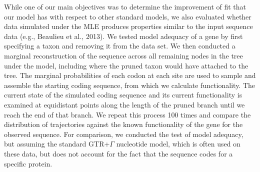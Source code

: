 \documentclass{article}
\begin{document}
While one of our main objectives was to determine the improvement of fit that our model has with respect to other standard models, we also evaluated whether data simulated under the MLE produces properties similar to the input sequence data (e.g., Beaulieu et al., 2013). 
We tested model adequacy of a gene by first specifying a taxon and removing it from the data set. 
We then conducted a marginal reconstruction of the sequence across all remaining nodes in the tree under the model, including where the pruned taxon would have attached to the tree. 
The marginal probabilities of each codon at each site are used to sample and assemble the starting coding sequence, from which we calculate functionality. 
The current state of the simulated coding sequence and its current functionality is examined at equidistant points along the length of the pruned branch until we reach the end of that branch.  
We repeat this process 100 times and compare the distribution of trajectories against the known functionality of the gene for the observed sequence. 
For comparison, we conducted the test of model adequacy, but assuming the standard GTR+$\Gamma$ nucleotide model, which is often used on these data, but does not account for the fact that the sequence codes for a specific protein.




\end{document}
